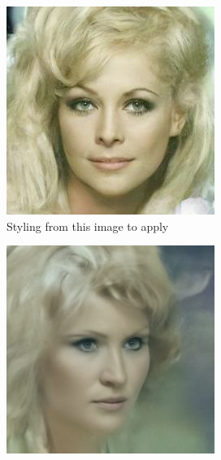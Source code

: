 \begin{figure}[H]
    \centering
    \begin{subfigure}[b]{0.25\textwidth}
        \includegraphics[width=\textwidth]{./figures/ddpm_steps1000_seed42_img_0}
        \caption{Styling from this image to apply}
    \end{subfigure}
    \begin{subfigure}[b]{0.25\textwidth}
        \includegraphics[width=\textwidth]{./figures/ddim_steps10_seed42_img_0}

\end{subfigure}
\end{figure}
